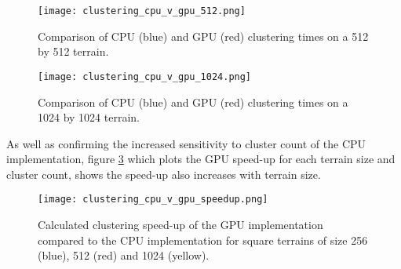 \begin{figure}
\center
	\texttt{[image: clustering\_cpu\_v\_gpu\_512.png]}
	\caption{ Comparison of CPU (blue) and GPU (red) clustering times on a 512 by 512 terrain.}	
	\label{fig:clustering_cpu_v_gpu_512}
\end{figure}

\begin{figure}
\center
	\texttt{[image: clustering\_cpu\_v\_gpu\_1024.png]}
	\caption{ Comparison of CPU (blue) and GPU (red) clustering times on a 1024 by 1024 terrain.}	
	\label{fig:clustering_cpu_v_gpu_1024}
\end{figure}

As well as confirming the increased sensitivity to cluster count of the CPU implementation, figure \ref{fig:clustering_cpu_v_gpu_speedup} which plots the GPU speed-up for each terrain size and cluster count, shows the speed-up also increases with terrain size. 

\begin{figure}
\center
	\texttt{[image: clustering\_cpu\_v\_gpu\_speedup.png]}
	\caption{ Calculated clustering speed-up of the GPU implementation compared to the CPU implementation for square terrains of size 256 (blue), 512 (red) and 1024 (yellow).}	
	\label{fig:clustering_cpu_v_gpu_speedup}
\end{figure}